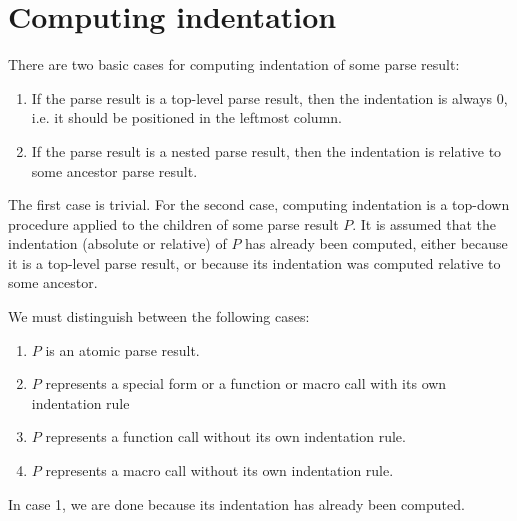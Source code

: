 \section{Computing indentation}
\label{sec-internals-common-lisp-mode-indentation}

There are two basic cases for computing indentation of some parse
result:

\begin{enumerate}
\item If the parse result is a top-level parse result, then the
  indentation is always 0, i.e. it should be positioned in the
  leftmost column.
\item If the parse result is a nested parse result, then the
  indentation is relative to some ancestor parse result.
\end{enumerate}

The first case is trivial.  For the second case, computing indentation
is a top-down procedure applied to the children of some parse result
$P$.  It is assumed that the indentation (absolute or relative) of $P$
has already been computed, either because it is a top-level parse
result, or because its indentation was computed relative to some
ancestor.

We must distinguish between the following cases:

\begin{enumerate}
\item $P$ is an atomic parse result.
\item $P$ represents a special form or a function or macro call with
  its own indentation rule
\item $P$ represents a function call without its own indentation rule.
\item $P$ represents a macro call without its own indentation rule.
\end{enumerate}

In case 1,  we are done because its indentation has already been
computed.
